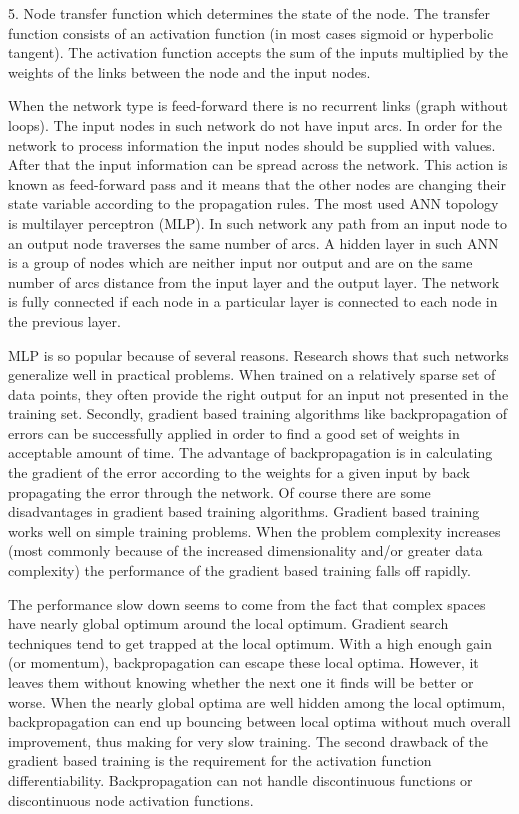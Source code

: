 \documentclass{llncs}
\begin{document}
5. Node transfer function which determines the state of the node. The transfer function consists of an activation function (in most cases sigmoid or hyperbolic tangent). The activation function accepts the sum of the inputs multiplied by the weights of the links between the node and the input nodes.

When the network type is feed-forward there is no recurrent links (graph without loops). The input nodes in such network do not have input arcs. In order for the network to process information the input nodes should be supplied with values. After that the input information can be spread across the network. This action is known as feed-forward pass and it means that the other nodes are changing their state variable according to the propagation rules. The most used ANN topology is multilayer perceptron (MLP). In such network any path from an input node to an output node traverses the same number of arcs. A hidden layer in such ANN is a group of nodes which are neither input nor output and are on the same number of arcs distance from the input layer and the output layer. The network is fully connected if each node in a particular layer is connected to each node in the previous layer. 

MLP is so popular because of several reasons. Research shows that such networks generalize well in practical problems. When trained on a relatively sparse set of data points, they often provide the right output for an input not presented in the training set. Secondly, gradient based training algorithms like backpropagation of errors can be successfully applied in order to find a good set of weights in acceptable amount of time. The advantage of backpropagation is in calculating the gradient of the error according to the weights for a given input by back propagating the error through the network. Of course there are some disadvantages in gradient based training algorithms. Gradient based training works well on simple training problems. When the problem complexity increases (most commonly because of the increased dimensionality and/or greater data complexity) the performance of the gradient based training falls off rapidly. 

The performance slow down seems to come from the fact that complex spaces have nearly global optimum around the local optimum. Gradient search techniques tend to get trapped at the local optimum. With a high enough gain (or momentum), backpropagation can escape these local optima. However, it leaves them without knowing whether the next one it finds will be better or worse. When the nearly global optima are well hidden among the local optimum, backpropagation can end up bouncing between local optima without much overall improvement, thus making for very slow training. The second drawback of the gradient based training is the requirement for the activation function differentiability. Backpropagation can not handle discontinuous functions or discontinuous node activation functions.
%
\end{document}
